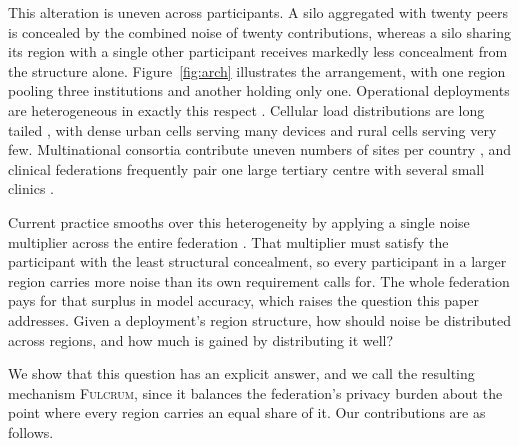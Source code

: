 \documentclass[acmsmall,screen,review,anonymous]{acmart}
\theoremstyle{acmdefinition}%
\newcommand{\Fulcrum}{\textsc{Fulcrum}\xspace}
\begin{document}
This alteration is uneven across participants. A silo aggregated with twenty peers
is concealed by the combined noise of twenty contributions, whereas a silo sharing
its region with a single other participant receives markedly less concealment from
the structure alone. Figure~\ref{fig:arch} illustrates the arrangement, with one
region pooling three institutions and another holding only one. Operational
deployments are heterogeneous in exactly this respect \cite{kairouz2021advances}.
Cellular load distributions are long tailed \cite{wang2017cellular}, with dense
urban cells serving many devices and rural cells serving very few. Multinational
consortia contribute uneven numbers of sites per country
\cite{heyndrickx2023melloddy}, and clinical federations frequently pair one large
tertiary centre with several small clinics \cite{terrail2022flamby}.

Current practice smooths over this heterogeneity by applying a single noise
multiplier across the entire federation \cite{mcmahan2018dprnn,wei2020nbafl}. That
multiplier must satisfy the participant with the least structural concealment, so
every participant in a larger region carries more noise than its own requirement
calls for. The whole federation pays for that surplus in model accuracy, which
raises the question this paper addresses. Given a deployment's region structure,
how should noise be distributed across regions, and how much is gained by
distributing it well?

We show that this question has an explicit answer, and we call the resulting
mechanism \Fulcrum, since it balances the federation's privacy burden about the
point where every region carries an equal share of it. Our contributions are as
follows.
\end{document}
